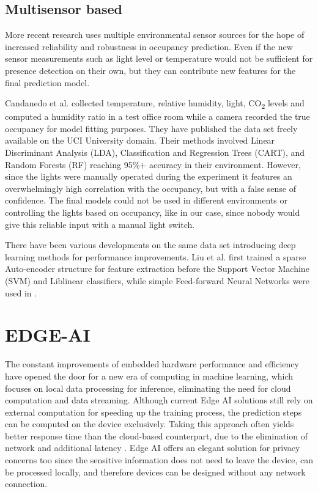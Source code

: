 \subsection{Multisensor based}
\label{section:Multisensor_research}
More recent research uses multiple environmental sensor sources for the hope of increased reliability and robustness in occupancy prediction. Even if the new sensor measurements such as light level or temperature would not be sufficient for presence detection on their own, but they can contribute new features for the final prediction model.

Candanedo et al. \cite{UCI_occ_dataset_pred} collected temperature, relative humidity, light, CO\textsubscript{2} levels and computed a humidity ratio in a test office room while a camera recorded the true occupancy for model fitting purposes. They have published the data set freely available on the UCI University domain. Their methods involved Linear Discriminant Analysis (LDA), Classification and Regression Trees (CART), and Random Forests (RF) reaching 95\%$+$ accuracy in their environment. However, since the lights were manually operated during the experiment it features an overwhelmingly high correlation with the occupancy, but with a false sense of confidence. The final models could not be used in different environments or controlling the lights based on occupancy, like in our case, since nobody would give this reliable input with a manual light switch.

There have been various developments on the same data set introducing deep learning methods for performance improvements. Liu et al. \cite{UCI_autoencoder}  first trained a sparse Auto-encoder structure for feature extraction before the Support Vector Machine (SVM) and Liblinear classifiers, while simple Feed-forward Neural Networks were used in \cite{UCI_nn_real_time}.



\section{EDGE-AI}
The constant improvements of embedded hardware performance and efficiency have opened the door for a new era of computing in machine learning, which focuses on local data processing for inference, eliminating the need for cloud computation and data streaming. Although current Edge AI solutions \cite{chen2019deep_edge_review} still rely on external computation for speeding up the training process, the prediction steps can be computed on the device exclusively. Taking this approach often yields better response time than the cloud-based counterpart, due to the elimination of network and additional latency \cite{zhou2018robust_edge_ai}. Edge AI offers an elegant solution for privacy concerns too since the sensitive information does not need to leave the device, can be processed locally, and therefore devices can be designed without any network connection.

